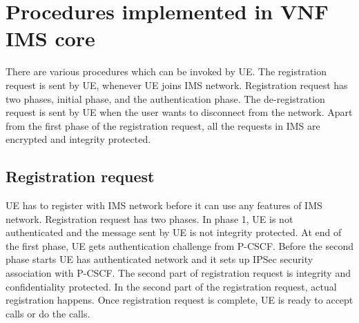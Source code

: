 \documentclass[hidelinks]{report}
\begin{document}
\section*{Procedures implemented in VNF IMS core}
There are various procedures which can be invoked by UE. The registration request is sent by UE, whenever UE joins IMS network. Registration request has two phases, initial phase, and the authentication phase. The de-registration request is sent by UE when the user wants to disconnect from the network. Apart from the first phase of the registration request, all the requests in IMS are encrypted and integrity protected.

\subsection*{Registration request}
UE has to register with IMS network before it can use any features of IMS network. Registration request has two phases. In phase 1, UE is not authenticated and the message sent by UE is not integrity protected. At end of the first phase, UE gets authentication challenge from P-CSCF. Before the second phase starts  UE has authenticated network and it sets up IPSec security association with P-CSCF. The second part of registration request is integrity and confidentiality protected. In the second part of the registration request, actual registration happens. Once registration request is complete, UE is ready to accept calls or do the calls. 
\end{document}
